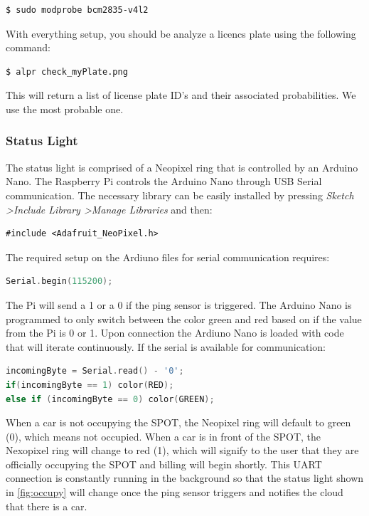\vspace{0.5cm}
\begin{lstlisting}[language=bash]
$ sudo modprobe bcm2835-v4l2
\end{lstlisting}

With everything setup, you should be analyze a licencs plate using the following command:

\vspace{0.5cm}
\begin{lstlisting}[language=bash]
$ alpr check_myPlate.png 
\end{lstlisting}

This will return a list of license plate ID's and their associated probabilities. We use the most probable one.

\subsubsection{Status Light}
The status light is comprised of a Neopixel ring that is controlled by an Arduino Nano.
The Raspberry Pi controls the Arduino Nano through USB Serial communication. 
The necessary library can be easily installed by pressing \textit{Sketch \textgreater Include Library \textgreater Manage Libraries} and then:
\begin{verbatim}
#include <Adafruit_NeoPixel.h>
\end{verbatim}
The required setup on the Ardiuno files for serial communication requires:
\begin{lstlisting}[language=C]
Serial.begin(115200);
\end{lstlisting}
The Pi will send a 1 or a 0 if the ping sensor is triggered.
The Arduino Nano is programmed to only switch between the color green and red based on if the value from the Pi is 0 or 1. 
Upon connection the Ardiuno Nano is loaded with code that will iterate continuously.
If the serial is available for communication:
\begin{lstlisting}[language=C]
incomingByte = Serial.read() - '0';
if(incomingByte == 1) color(RED);
else if (incomingByte == 0) color(GREEN);
\end{lstlisting}
When a car is not occupying the SPOT, the Neopixel ring will default to green (0), which means not occupied.
When a car is in front of the SPOT, the Nexopixel ring will change to red (1), which will signify to the user that they are officially occupying the SPOT and billing will begin shortly. 
This UART connection is constantly running in the background so that the status light shown in \ref{fig:occupy} will change once the ping sensor triggers and notifies the cloud that there is a car.


